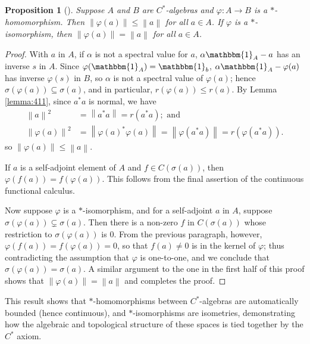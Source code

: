 \documentclass[11pt,a4paper]{report}
\theoremstyle{plain}
\newtheorem{prop}{Proposition}
\theoremstyle{definition}
\newcommand{\1}{\mathbbm{1}}
\renewcommand{\phi}{\varphi}
\newcommand{\spec}[1]{\sigma(#1)}
\begin{document}
\begin{prop}[{\cite[4.1.8]{kadison83}}] \label{prop:homo}
	Suppose $A$ and $B$ are $C^\ast$-algebras and $\phi:A\to B$ is a $\ast$-homomorphism. Then
	$\left\|\phi(a)\right\| \leq \left\|a\right\|$ for all $a \in A$. If $\phi$ is a $\ast$-isomorphism, then
	$\left\|\phi(a)\right\| = \left\|a\right\|$ for all $a \in A$.
\end{prop}
\begin{proof}
	With $a$ in $A$, if $\alpha$ is not a spectral value for $a$, $\alpha\1_A-a$ has an inverse $s$ in 
	$A$. Since $\phi(\1_A) =\1_b$, $\alpha \1_A-\phi(a)$ has inverse $\phi(s)$ in $B$, so $\alpha$ is 
	not a spectral value of $\phi(a)$; hence $\spec {\phi(a)}\subseteq \spec a$, and in particular, 
	$r(\phi(a))\leq r(a)$. By Lemma \ref{lemma:411}, since $a^\ast a$ is normal, we have 
	\begin{align*}
		\left\|a\right\|^2			&=	\left\|a^\ast a\right\| 	= 	r(a^\ast a); 	\mbox{ and }	\\
		\left\|\phi(a)\right\|^2 &=\left\|\phi(a)^\ast\phi(a)\right\| = 
							 \left\|\phi(a^\ast a)\right\| = r(\phi(a^\ast a)).
	\end{align*}
	so $\left\|\phi(a)\right\|\leq \left\|a\right\|$.
	
	If $a$ is a self-adjoint element of $A$ and $f \in C(\spec a)$, then $\phi(f(a))=f(\phi(a))$. This 
	follows from the final assertion of the continuous functional calculus.
	
	Now suppose $\phi$ is a $\ast$-isomorphism, and for a self-adjoint $a$ in $A$, suppose $
	\spec{\phi(a)} \subsetneq \spec a$. Then there is a non-zero $f$ in $C(\spec a)$ whose restriction 
	to $\spec{\phi(a)}$ is 0. From the previous paragraph, however, $\phi(f(a)) = f(\phi(a))=0$, so that 
	$f(a)\not= 0$ is in the kernel of $\phi$; thus contradicting the assumption that $\phi$ is 
	one-to-one, and we conclude that $\spec{\phi(a)} = \spec a$. A similar argument to the one in the 
	first half of this proof shows that $\left\|\phi(a)\right\| = \left\|a\right\|$ and completes the proof.
\end{proof}
This result shows that $\ast$-homomorphisms between $C^\ast$-algebras are 
automatically bounded (hence continuous), and $\ast$-isomorphisms are 
isometries, demonstrating how the algebraic and topological structure of these 
spaces is tied together by the $C^\ast$ axiom.
\end{document}
